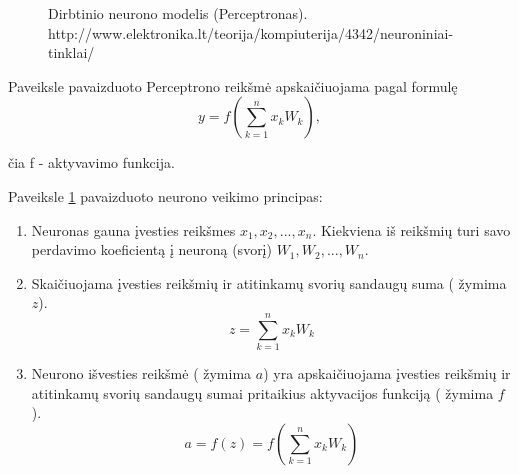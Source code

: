 \begin{figure}
  \centering
{}
\caption{Dirbtinio neurono modelis (Perceptronas).\\http://www.elektronika.lt/teorija/kompiuterija/4342/neuroniniai-tinklai/}
\label{fig:perceptron}
\end{figure}

Paveiksle pavaizduoto Perceptrono reikšmė apskaičiuojama pagal formulę
\begin{equation*}
  y = f \left(\sum_{k=1}^{n} x_k W_k \right),
\end{equation*}

čia f - aktyvavimo funkcija.

Paveiksle \ref{fig:perceptron} pavaizduoto neurono veikimo principas:
\begin{enumerate}

\item Neuronas gauna įvesties reikšmes $x_1, x_2, ... , x_n$. Kiekviena iš reikšmių turi savo perdavimo koeficientą į neuroną (svorį) $W_1, W_2, ... , W_n$.
\item  Skaičiuojama įvesties reikšmių ir atitinkamų svorių sandaugų suma ( žymima $z$).
\begin{equation*}
  z = \sum_{k=1}^{n} x_k W_k
\end{equation*}

\item  Neurono išvesties reikšmė ( žymima $a$) yra apskaičiuojama įvesties reikšmių ir atitinkamų svorių sandaugų sumai pritaikius aktyvacijos funkciją ( žymima $f$).
\begin{equation*}
  a = f(z) = f(\sum_{k=1}^{n} x_k W_k)
\end{equation*}
\end{enumerate}

